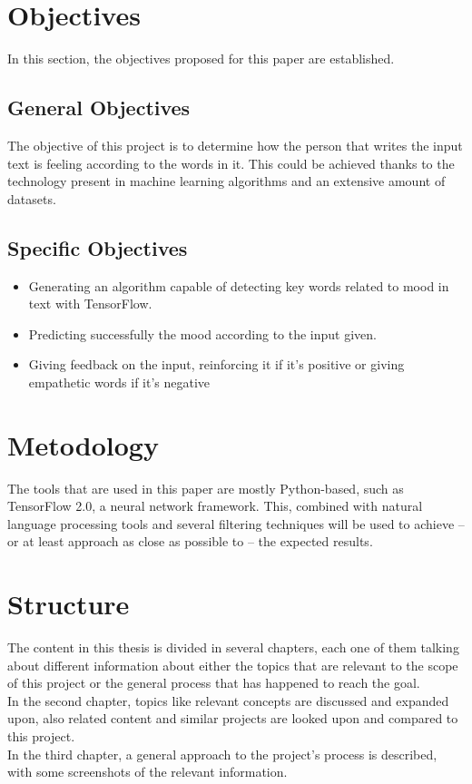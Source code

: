 \section{Objectives}
In this section, the objectives proposed for this paper are established.

\subsection{General Objectives}
The objective of this project is to determine how the person that writes the input text is feeling according to the words in it. This could be achieved thanks to the technology present in machine learning algorithms and an extensive amount of datasets.

\subsection{Specific Objectives}
\begin{itemize}
	\item Generating an algorithm capable of detecting key words related to mood in text with TensorFlow.
	\item Predicting successfully the mood according to the input given.
	\item Giving feedback on the input, reinforcing it if it's positive or giving empathetic words if it's negative
\end{itemize}

\section{Metodology}
The tools that are used in this paper are mostly Python-based, such as TensorFlow 2.0, a neural network framework. This, combined with natural language processing tools and several filtering techniques will be used to achieve -- or at least approach as close as possible to -- the expected results.

\section{Structure}
The content in this thesis is divided in several chapters, each one of them talking about different information about either the topics that are relevant to the scope of this project or the general process that has happened to reach the goal.\\
In the second chapter, topics like relevant concepts are discussed and expanded upon, also related content and similar projects are looked upon and compared to this project.\\
In the third chapter, a general approach to the project's process is described, with some screenshots of the relevant information.
\clearpage